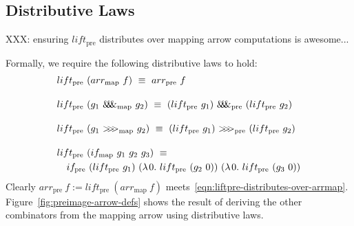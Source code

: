 \documentclass[preprint]{sigplanconf}
\newcommand{\arrowlift}{\ensuremath{lift}}
\newcommand{\arrowarr}{\ensuremath{arr}}
\newcommand{\arrowcomp}{\ensuremath{{>}\mspace{-6mu}{>}\mspace{-6mu}{>}}}
\newcommand{\arrowpair}{\ensuremath{\mathit{\&\mspace{-7.5mu}\&\mspace{-7.5mu}\&}}}
\newcommand{\arrowif}{\ensuremath{if}}
\newcommand{\map}{_\mathrm{map}}
\newcommand{\arrmap}{\arrowarr\map}
\newcommand{\compmap}{\arrowcomp\map}
\newcommand{\pairmap}{\arrowpair\map}
\newcommand{\ifmap}{\arrowif\map}
\newcommand{\pre}{_\mathrm{pre}}
\newcommand{\liftpre}{\arrowlift\pre}
\newcommand{\arrpre}{\arrowarr\pre}
\newcommand{\comppre}{\arrowcomp\pre}
\newcommand{\pairpre}{\arrowpair\pre}
\newcommand{\ifpre}{\arrowif\pre}
\begin{document}
\subsection{Distributive Laws}

XXX: ensuring $\liftpre$ distributes over mapping arrow computations is awesome...

Formally, we require the following distributive laws to hold:
\begin{align}
	&\begin{aligned}
		\liftpre~(\arrmap~f) \ \equiv \ \arrpre~f
	\label{eqn:liftpre-distributes-over-arrmap}
	\end{aligned} \\
\nonumber \\[-6pt]
	&\begin{aligned}
		\liftpre~(g_1~\pairmap~g_2) \ \equiv \ (\liftpre~g_1)~\pairpre~(\liftpre~g_2)
	\label{eqn:liftpre-distributes-over-pairmap}
	\end{aligned} \\
\nonumber \\[-6pt]
	&\begin{aligned}
		\liftpre~(g_1~\compmap~g_2) \ \equiv \ (\liftpre~g_1)~\comppre~(\liftpre~g_2)
	\label{eqn:liftpre-distributes-over-compmap}
	\end{aligned} \\
\nonumber \\[-6pt]
	&\begin{aligned}
		&\liftpre~(\ifmap~g_1~g_2~g_3) \ \equiv \ \\
		&\tab\ifpre~(\liftpre~g_1)~(\fun{0}{\liftpre~(g_2~0)})~(\fun{0}{\liftpre~(g_3~0)})
	\label{eqn:liftpre-distributes-over-ifmap}
	\end{aligned}
\end{align}
Clearly $\arrpre~f := \liftpre~(\arrmap~f)$ meets~\eqref{eqn:liftpre-distributes-over-arrmap}.
Figure~\ref{fig:preimage-arrow-defs} shows the result of deriving the other combinators from the mapping arrow using distributive laws.
\end{document}
